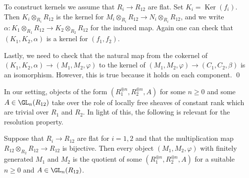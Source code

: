 \documentclass[12pt]{amsart}
\newcommand{\Kernel}{\operatorname{Ker}}
\newcommand{\ra}{\rightarrow}
\begin{document}
To construct kernels we assume that  $R_i\ra R_{12}$ are flat. Set $K_i=\Kernel(f_i)$.
Then $K_i\otimes_{R_i}R_{12}$ is the kernel for $M_i\otimes_{R_i}R_{12}\ra N_i\otimes_{R_i}R_{12}$,
and we write $\alpha:K_1\otimes_{R_1}R_{12}\ra K_2\otimes_{R_2}R_{12}$ for the induced map.
Again one can check that $(K_1,K_2,\alpha)$ is a kernel for $(f_1,f_2)$. 

Lastly, we need to check that the natural map from the cokernel of $(K_1,K_2, \alpha) \to (M_1,M_2,\varphi)$
to the kernel of $(M_1,M_2,\varphi) \to (C_1,C_2, \beta)$ is an isomorphism. However, this is true because it holds on each component. \qed

\medskip
In our setting, objects of the form $(R_1^{\oplus n},R_2^{\oplus n}, A)$ for some $n\geq 0$ and some $A\in \GL_n(R_{12})$
take over the role of locally free sheaves of constant rank which are trivial over $R_1$ and $R_2$. In light of this, the following is relevant for the resolution property.

\begin{Theorem}
\label{resolution property from commutative algebra}
Suppose that $R_i\ra R_{12}$   are flat for $i=1,2$ and that the multiplication map $R_{12}\otimes_{R_2}R_{12}\ra R_{12}$
is bijective.
Then every object $(M_1,M_2,\varphi)$ with finitely generated $M_1$ and $M_2$ 
is the quotient of some $(R_1^{\oplus n}, R_2^{\oplus n}, A)$  for a suitable $n\geq 0$ and $A\in \GL_n(R_{12})$.
\end{Theorem}
\end{document}
